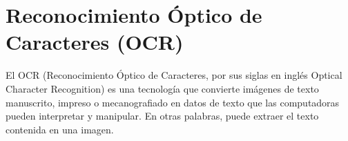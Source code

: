 
\section{Reconocimiento Óptico de Caracteres (OCR)}
El OCR (Reconocimiento Óptico de Caracteres, por sus siglas en inglés Optical Character Recognition) es una tecnología que convierte imágenes de texto manuscrito, impreso o mecanografiado en datos de texto que las computadoras pueden interpretar y manipular. En otras palabras, puede extraer el texto contenida en una imagen.

